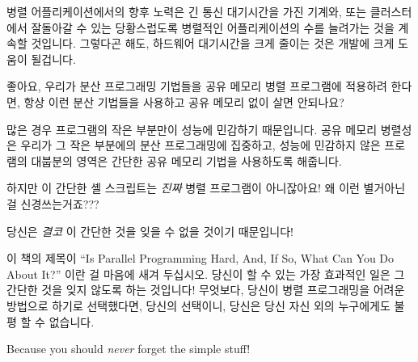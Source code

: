 \begin{enumerate}
	병렬 어플리케이션에서의 향후 노력은 긴 통신 대기시간을 가진 기계와,
	또는 클러스터에서 잘돌아갈 수 있는 당황스럽도록 병렬적인 어플리케이션의
	수를 늘려가는 것을 계속할 것입니다.
	그렇다곤 해도, 하드웨어 대기시간을 크게 줄이는 것은 개발에 크게 도움이
	될겁니다.

\QuickQ{}
	좋아요, 우리가 분산 프로그래밍 기법들을 공유 메모리 병렬 프로그램에
	적용하려 한다면, 항상 이런 분산 기법들을 사용하고 공유 메모리 없이 살면
	안되나요?

\QuickA{}
	많은 경우 프로그램의 작은 부분만이 성능에 민감하기 때문입니다.
	공유 메모리 병렬성은 우리가 그 작은 부분에의 분산 프로그래밍에
	집중하고, 성능에 민감하지 않은 프로램의 대붑분의 영역은 간단한 공유
	메모리 기법을 사용하도록 해줍니다.

\QuickQ{}
	하지만 이 간단한 셸 스크립트는 \emph{진짜} 병렬 프로그램이 아니잖아요!
	왜 이런 별거아닌 걸 신경쓰는거죠???

\QuickA{}
	당신은 \emph{결코} 이 간단한 것을 잊을 수 없을 것이기 때문입니다!

	이 책의 제목이 ``Is Parallel Programming Hard, And, If So, What Can You
	Do About It?'' 이란 걸 마음에 새겨 두십시오.
	당신이 할 수 있는 가장 효과적인 일은 그 간단한 것을 잊지 않도록 하는
	것입니다!
	무엇보다, 당신이 병렬 프로그래밍을 어려운 방법으로 하기로 선택했다면,
	당신의 선택이니, 당신은 당신 자신 외의 누구에게도 불평 할 수 없습니다.

	\iffalse
	Because you should \emph{never} forget the simple stuff!


\end{enumerate}

